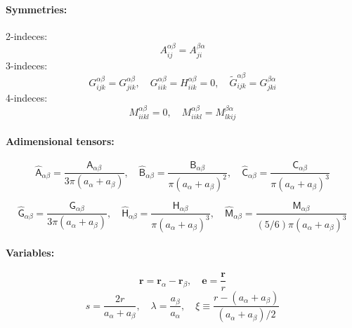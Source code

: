 \documentclass[12pt]{article}
\newcommand{\tens}[1]{\bm{\mathsf{#1}}}
\begin{document}
\paragraph{Symmetries:}
2-indeces:
\begin{equation}
 A_{ij}^{\alpha\beta} =  A_{ji}^{\beta\alpha}
\end{equation}
3-indeces:
\begin{equation}
 G_{ijk}^{\alpha\beta} =   G_{jik}^{\alpha\beta} , \quad 
 G_{iik}^{\alpha\beta} =   H_{iik}^{\alpha\beta}  = 0, \quad 
 \tilde{G}_{ijk}^{\alpha\beta}  =  G_{jki}^{\beta\alpha} 
\end{equation}
4-indeces:
\begin{equation}
 M_{iikl}^{\alpha\beta} = 0,
\quad 
 M_{iikl}^{\alpha\beta} =  M_{lkij}^{\beta\alpha} 
\end{equation}

\paragraph{Adimensional tensors:}
\begin{equation}
 \hat{\tens{A}}_{\alpha\beta}
= \frac{\tens{A}_{\alpha\beta}}{3\pi(a_{\alpha} + a_{\beta})},
\quad
 \hat{\tens{B}}_{\alpha\beta}
= \frac{\tens{B}_{\alpha\beta}}{\pi(a_{\alpha}+ a_{\beta})^2},
\quad
 \hat{\tens{C}}_{\alpha\beta}
= \frac{\tens{C}_{\alpha\beta}}{\pi(a_{\alpha}+ a_{\beta})^3}
\end{equation}

\begin{equation}
 \hat{\tens{G}}_{\alpha\beta}
= \frac{\tens{G}_{\alpha\beta}}{3\pi(a_{\alpha} + a_{\beta})},
\quad
 \hat{\tens{H}}_{\alpha\beta}
= \frac{\tens{H}_{\alpha\beta}}{\pi(a_{\alpha}+ a_{\beta})^3},
\quad
 \hat{\tens{M}}_{\alpha\beta}
= \frac{\tens{M}_{\alpha\beta}}{(5/6)\pi(a_{\alpha}+ a_{\beta})^3}
\end{equation}

\paragraph{Variables:}
\begin{equation}
 \bm{r} = \bm{r}_\alpha - \bm{r}_\beta, \quad
 \bm{e} = \frac{\bm{r}}{r}
\end{equation}
\begin{equation}
  s = \frac{2r}{a_{\alpha}+ a_{\beta}}, \quad
 \lambda = \frac{a_\beta}{a_\alpha}, \quad
\xi \equiv \frac{r -  (a_\alpha + a_\beta)}{(a_{\alpha}+ a_{\beta})/2} 
\end{equation}
\end{document}
